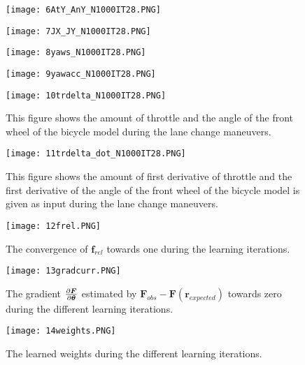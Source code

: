 \begin{figure}[h!]
	\centering
	\texttt{[image: 6AtY\_AnY\_N1000IT28.PNG]}
\end{figure}

\begin{figure}[h!]
	\centering
	\texttt{[image: 7JX\_JY\_N1000IT28.PNG]}
\end{figure}

\begin{figure}[h!]
	\centering
	\texttt{[image: 8yaws\_N1000IT28.PNG]}
\end{figure}

\begin{figure}[h!]
	\centering
	\texttt{[image: 9yawacc\_N1000IT28.PNG]}
\end{figure}

\begin{figure}[h!]
	\centering
	\texttt{[image: 10trdelta\_N1000IT28.PNG]}
	\caption{This figure shows the amount of throttle and the angle of the front wheel of the bicycle model during the lane change maneuvers.}
	\label{fig:app_deltaE}
\end{figure}

\begin{figure}[h!]
	\centering
	\texttt{[image: 11trdelta\_dot\_N1000IT28.PNG]}
	\caption{This figure shows the amount of first derivative of throttle and the first derivative of the angle of the front wheel of the bicycle model is given as input during the lane change maneuvers.}
	\label{fig:app_delta_dotE}
\end{figure}

\begin{figure}[h!]
	\centering
	\texttt{[image: 12frel.PNG]}
	\caption{The convergence of $\bm{f}_{rel}$ towards one during the learning iterations.}
	\label{fig:app_convE}
\end{figure}

\begin{figure}[h!]
	\centering
	\texttt{[image: 13gradcurr.PNG]}
	\caption{The gradient $\pdv{\bm{F}}{\bm{\theta}}$ estimated by $\bm{F}_{obs} - \bm{F}(\bm{r}_{expected})$ towards zero during the different learning iterations. }
	\label{fig:app_gradE}
\end{figure}

\begin{figure}[h!]
	\centering
	\texttt{[image: 14weights.PNG]}
	\caption{The learned weights during the different learning iterations.}
	\label{fig:app_weightsE}
\end{figure}

